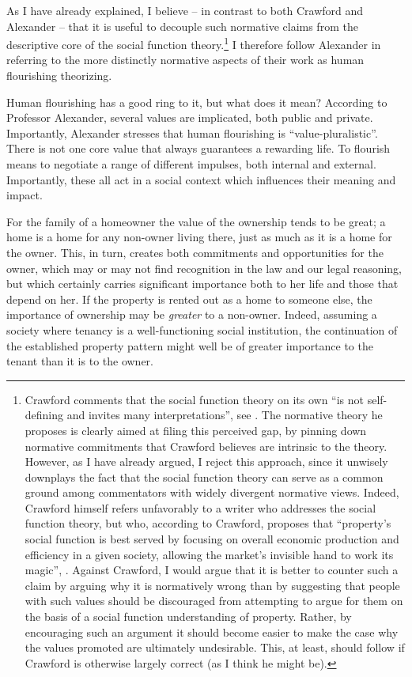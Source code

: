 As I have already explained, I believe -- in contrast to both Crawford and Alexander -- that it is useful to decouple such normative claims from the descriptive core of the social function theory.\footnote{Crawford comments that the social function theory on its own  ``is not self-defining and invites many interpretations'', see \cite[1089]{crawford12}. The normative theory he proposes is clearly aimed at filing this perceived gap, by pinning down normative commitments that Crawford believes are intrinsic to the theory. However, as I have already argued, I reject this approach, since it unwisely downplays the fact that the social function theory can serve as a common ground among commentators with widely divergent normative views. Indeed, Crawford himself refers unfavorably to a writer who addresses the social function theory, but who, according to Crawford, proposes that ``property's social function is best served by focusing on overall economic production and efficiency in a given society, allowing the market's invisible hand to work its magic'', \cite[see][1089]{crawford12}. Against Crawford, I would argue that it is better to counter such a claim by arguing why it is normatively wrong than by suggesting that people with such values should be discouraged from attempting to argue for them on the basis of a social function understanding of property. Rather, by encouraging such an argument it should become easier to make the case why the values promoted are ultimately undesirable. This, at least, should follow if Crawford is otherwise largely correct (as I think he might be).} I therefore follow Alexander in referring to the more distinctly normative aspects of their work as human flourishing theorizing. 

Human flourishing has a good ring to it, but what does it mean? According to Professor Alexander, several values are implicated, both public and private. Importantly, Alexander stresses that human flourishing is ``value-pluralistic''. There is not one core value that always guarantees a rewarding life. To flourish means to negotiate a range of different impulses, both internal and external. Importantly, these all act in a social context which influences their meaning and impact.

For the family of a homeowner the value of the ownership tends to be great; a home is a home for any non-owner living there, just as much as it is a home for the owner. This, in turn, creates both commitments and opportunities for the owner, which may or may not find recognition in the law and our legal reasoning, but which certainly carries significant importance both to her life and those that depend on her. If the property is rented out as a home to someone else, the importance of ownership may be {\it greater} to a non-owner. Indeed, assuming a society where tenancy is a well-functioning social institution, the continuation of the established property pattern might well be of greater importance to the tenant than it is to the owner.

